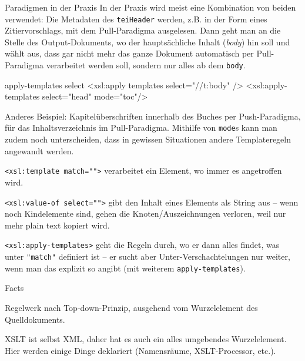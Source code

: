 \begin{frame}{Paradigmen in der Praxis}
In der Praxis wird meist eine Kombination von beiden verwendet: Die Metadaten des \texttt{teiHeader} werden, z.B. in der Form eines Zitiervorschlags, mit dem Pull-Paradigma ausgelesen. Dann geht man an die Stelle des Output-Dokuments, wo der hauptsächliche Inhalt (\emph{body}) hin soll und wählt aus, dass gar nicht mehr das ganze Dokument automatisch per Pull-Paradigma verarbeitet werden soll, sondern nur alles ab dem \texttt{body}.
\begin{myxml}{apply-templates select}
<xsl:apply templates select="//t:body" />
<xsl:apply-templates select="head" mode="toc"/>
\end{myxml}

\alert{Anderes Beispiel:} Kapitelüberschriften innerhalb des Buches per Push-Paradigma, für das Inhaltsverzeichnis im Pull-Paradigma. Mithilfe von \texttt{mode}s kann man zudem noch unterscheiden, dass in gewissen Situationen andere Templateregeln angewandt werden. 

\verb|<xsl:template match="">| verarbeitet ein Element, wo immer es angetroffen wird.

\verb|<xsl:value-of select="">| gibt den Inhalt eines Elements als String aus -- wenn noch Kindelemente sind, gehen die Knoten/Auszeichnungen verloren, weil nur mehr plain text kopiert wird.

\texttt{<xsl:apply-templates>} geht die Regeln durch, wo er dann alles findet, was unter \texttt{"match"} definiert ist  -- er sucht aber Unter-Verschachtelungen nur weiter, wenn man das explizit so angibt (mit weiterem \texttt{apply-templates}).

\end{frame}

\begin{frame}{Facts}


Regelwerk nach Top-down-Prinzip, ausgehend vom
Wurzelelement des Quelldokuments.

XSLT ist selbst XML, daher hat es auch ein alles umgebendes Wurzelelement. Hier werden einige Dinge deklariert (Namensräume, XSLT-Processor, etc.).

\end{frame}

